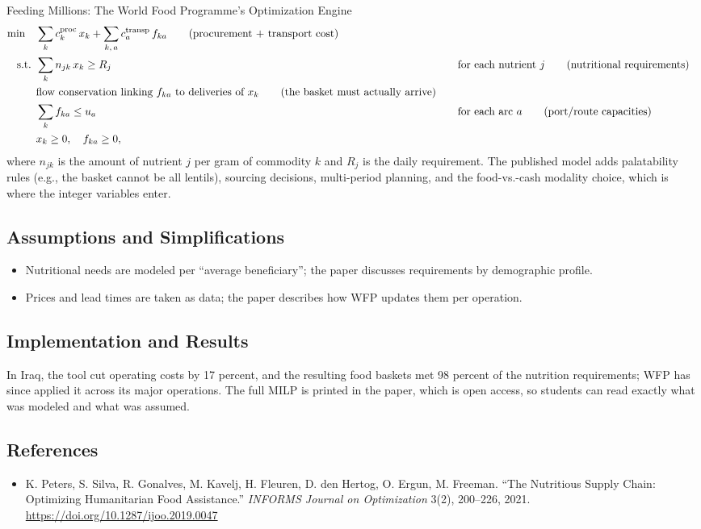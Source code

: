 \begin{casestudybox}{Feeding Millions: The World Food Programme's Optimization Engine}
\begin{align*}
\min \quad & \sum_{k} c^{\text{proc}}_k\, x_k + \sum_{k,\,a} c^{\text{transp}}_a\, f_{ka}   \tag{procurement + transport cost} \\
\text{ s.t. }        & \sum_{k} n_{jk} \, x_k \geq R_j &&\quad \text{for each nutrient } j   \tag{nutritional requirements} \\
           & \text{flow conservation linking } f_{ka} \text{ to deliveries of } x_k   \tag{the basket must actually arrive} \\
           & \sum_{k} f_{ka} \leq u_a &&\quad \text{for each arc } a   \tag{port/route capacities} \\
           & x_k \geq 0, \quad f_{ka} \geq 0,
\end{align*}
where $n_{jk}$ is the amount of nutrient $j$ per gram of commodity $k$ and $R_j$ is the daily requirement.  The published model adds palatability rules (e.g., the basket cannot be all lentils), sourcing decisions, multi-period planning, and the food-vs.-cash modality choice, which is where the integer variables enter.

\subsection*{Assumptions and Simplifications}
\begin{itemize}
\item Nutritional needs are modeled per ``average beneficiary''; the paper discusses requirements by demographic profile.
\item Prices and lead times are taken as data; the paper describes how WFP updates them per operation.
\end{itemize}

\subsection*{Implementation and Results}
In Iraq, the tool cut operating costs by 17 percent, and the resulting food baskets met 98 percent of the nutrition requirements; WFP has since applied it across its major operations.  The full MILP is printed in the paper, which is open access, so students can read exactly what was modeled and what was assumed.

\subsection*{References}
\begin{itemize}
\item K. Peters, S. Silva, R. Gonalves, M. Kavelj, H. Fleuren, D. den Hertog, O. Ergun, M. Freeman. ``The Nutritious Supply Chain: Optimizing Humanitarian Food Assistance.'' \emph{INFORMS Journal on Optimization} 3(2), 200--226, 2021. \url{https://doi.org/10.1287/ijoo.2019.0047}
\end{itemize}
\end{casestudybox}

